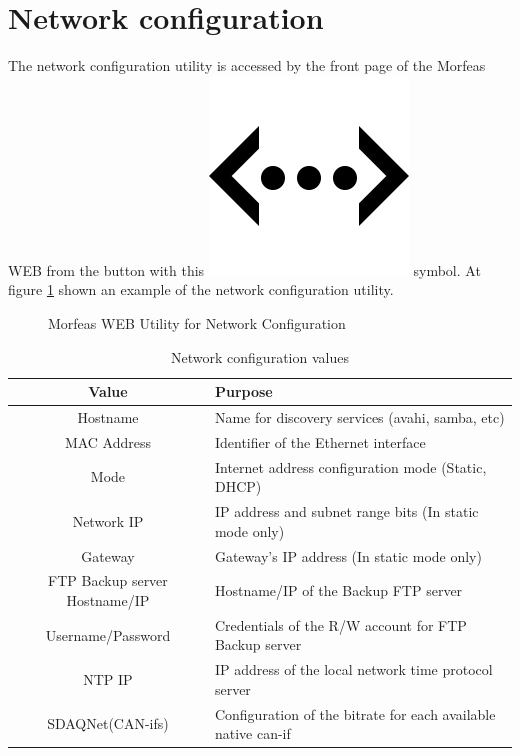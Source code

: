 \newpage
\section{Network configuration}
The network configuration utility is accessed by the front page of the Morfeas WEB from the button with
this \includegraphics[height=.125in]{../art/eth.png} symbol.
At figure \ref{fig:net_conf} shown an example of the network configuration utility.

\begin{figure}[h]
\centering
	\caption{Morfeas WEB Utility for Network Configuration}
	\label{fig:net_conf}
\end{figure}

\begin{table}[h!]
	\begin{center}
		\begin{tabular}{|c|l|}
			\hline
			\textbf{Value} & \textbf{Purpose}\\
			\hline
			Hostname & Name for discovery services (avahi, samba, etc)\\
			\hline
			MAC Address & Identifier of the Ethernet interface\\
			\hline
			Mode & Internet address configuration mode (Static, DHCP)\\
			\hline
			Network IP & IP address and subnet range bits (In static mode only)\\
			Gateway & Gateway's IP address (In static mode only)\\
			\hline
			FTP Backup server Hostname/IP & Hostname/IP of the Backup FTP server\\
			Username/Password & Credentials of the R/W account for FTP Backup server\\
			\hline
			NTP IP & IP address of the local network time protocol server\\
			\hline
			SDAQNet(CAN-ifs) & Configuration of the bitrate for each available native can-if\\
			\hline
		\end{tabular}
		\caption{Network configuration values}
		\label{tab:net_conf}
	\end{center}
\end{table}

